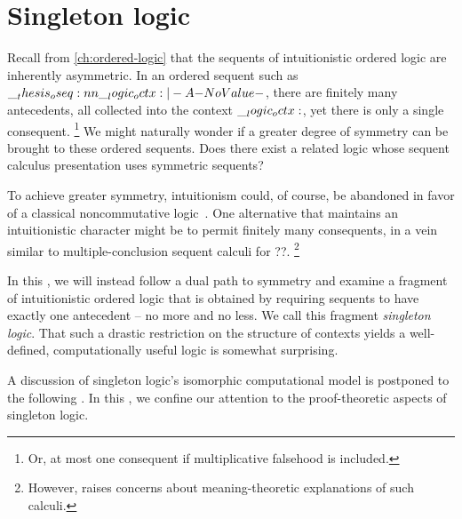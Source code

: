 \chapter{Singleton logic}\label{ch:singleton-logic}

Recall from \cref{ch:ordered-logic} that the sequents of intuitionistic ordered logic are inherently asymmetric.
In an ordered sequent such as $\oseq{\octx |- A}$, there are finitely many antecedents, all collected into the context $\__logic_octx:$, yet there is only a single consequent.%
\footnote{Or, at most one consequent if multiplicative falsehood is included.}
We might naturally wonder if a greater degree of symmetry can be brought to these ordered sequents.
Does there exist a related logic whose sequent calculus presentation uses symmetric sequents?

To achieve greater symmetry, intuitionism could, of course, be abandoned in favor of a classical noncommutative logic~\autocite{Abrusci:JSL91}.
One alternative that maintains an intuitionistic character might be to permit finitely many consequents, in a vein similar to multiple-conclusion sequent calculi for ??\autocite{??}.%
\footnote{However, \textcite{Steinberger:JPL11} raises concerns about meaning-theoretic explanations of such calculi.}

In this , we will instead follow a dual path to symmetry and examine a fragment of intuitionistic ordered logic that is obtained by requiring sequents to have exactly one antecedent -- no more and no less.
We call this fragment \emph{singleton logic}.
That such a drastic restriction on the structure of contexts yields a well-defined, computationally useful logic is somewhat surprising.

A discussion of singleton logic's isomorphic computational model is postponed to the following .
In this , we confine our attention to the proof-theoretic aspects of singleton logic.




